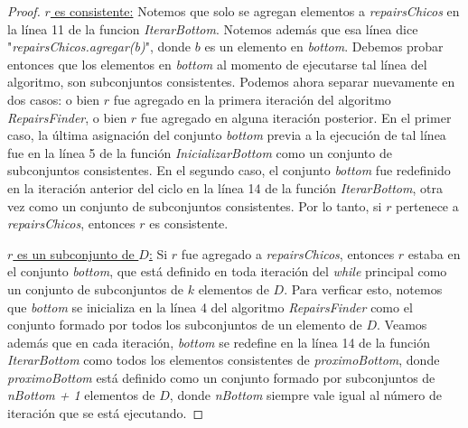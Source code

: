 \documentclass[11pt,a4paper,twoside]{tesis}
\begin{document}
\begin{proof}
\underline{$r$ es consistente:} Notemos que solo se agregan elementos a \textit{repairsChicos} en la línea 11 de la funcion \textit{IterarBottom}. Notemos además que esa línea dice "\textit{repairsChicos.agregar(b)}", donde $b$ es un elemento en \textit{bottom}. Debemos probar entonces que los elementos en \textit{bottom} al momento de ejecutarse tal línea del algoritmo, son subconjuntos consistentes. Podemos ahora separar nuevamente en dos casos: o bien $r$ fue agregado en la primera iteración del algoritmo \textit{RepairsFinder}, o bien $r$ fue agregado en alguna iteración posterior. En el primer caso, la última asignación del conjunto \textit{bottom} previa a la ejecución de tal línea fue en la línea 5 de la función \textit{InicializarBottom} como un conjunto de subconjuntos consistentes. En el segundo caso, el conjunto \textit{bottom} fue redefinido en la iteración anterior del ciclo en la línea 14 de la función \textit{IterarBottom}, otra vez como un conjunto de subconjuntos consistentes. Por lo tanto, si $r$ pertenece a \textit{repairsChicos}, entonces $r$ es consistente.

\underline{$r$ es un subconjunto de $D$:} Si $r$ fue agregado a \textit{repairsChicos}, entonces $r$ estaba en el conjunto \textit{bottom}, que está definido en toda iteración del \textit{while} principal como un conjunto de subconjuntos de $k$ elementos de $D$. Para verficar esto, notemos que \textit{bottom} se inicializa en la línea 4 del algoritmo \textit{RepairsFinder} como el conjunto formado por todos los subconjuntos de un elemento de $D$. Veamos además que en cada iteración, \textit{bottom} se redefine en la línea 14 de la función \textit{IterarBottom} como todos los elementos consistentes de \textit{proximoBottom}, donde \textit{proximoBottom} está definido como un conjunto formado por subconjuntos de \textit{nBottom + 1} elementos de $D$, donde \textit{nBottom} siempre vale igual al número de iteración que se está ejecutando.


\end{proof}
\end{document}

